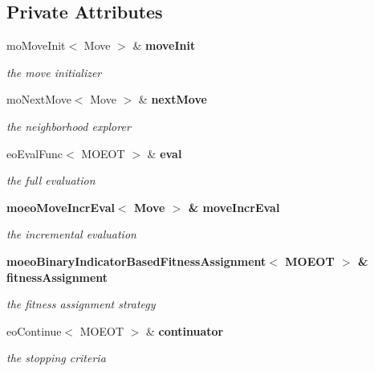 \subsection*{Private Attributes}
\begin{CompactItemize}
\item 
mo\-Move\-Init$<$ Move $>$ \& \bf{move\-Init}\label{classmoeoIBMOLS_b4b4908b893edd52d6fa24085d2a89e5}

\begin{CompactList}\small\item\em the move initializer \item\end{CompactList}\item 
mo\-Next\-Move$<$ Move $>$ \& \bf{next\-Move}\label{classmoeoIBMOLS_8b8ebbd6eb6c82caa796160b4be2a86b}

\begin{CompactList}\small\item\em the neighborhood explorer \item\end{CompactList}\item 
eo\-Eval\-Func$<$ MOEOT $>$ \& \bf{eval}\label{classmoeoIBMOLS_e9acda4b2f61f8960109a8c6fd52551e}

\begin{CompactList}\small\item\em the full evaluation \item\end{CompactList}\item 
\bf{moeo\-Move\-Incr\-Eval}$<$ Move $>$ \& \bf{move\-Incr\-Eval}\label{classmoeoIBMOLS_6c38636061bd03c4be809277e2dc257a}

\begin{CompactList}\small\item\em the incremental evaluation \item\end{CompactList}\item 
\bf{moeo\-Binary\-Indicator\-Based\-Fitness\-Assignment}$<$ MOEOT $>$ \& \bf{fitness\-Assignment}\label{classmoeoIBMOLS_0c858da33922736b74d9875766cec9d7}

\begin{CompactList}\small\item\em the fitness assignment strategy \item\end{CompactList}\item 
eo\-Continue$<$ MOEOT $>$ \& \bf{continuator}\label{classmoeoIBMOLS_c15985c0bb5d9ba835f35d99d7c42b14}

\begin{CompactList}\small\item\em the stopping criteria \item\end{CompactList}\end{CompactItemize}
